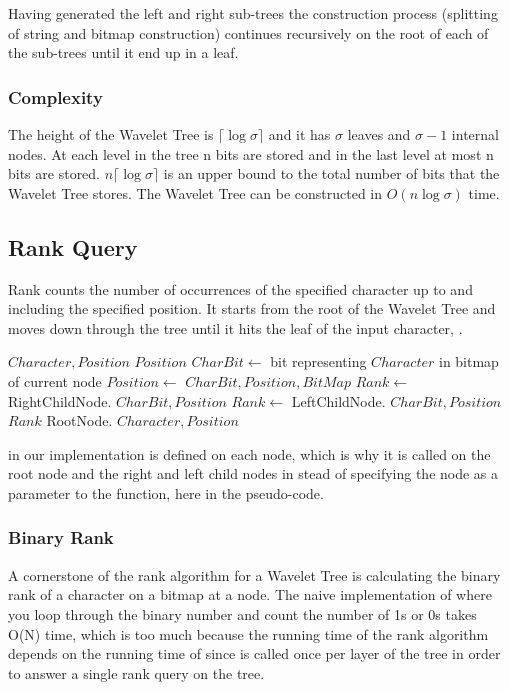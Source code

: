 Having generated the left and right sub-trees the construction process (splitting of string and bitmap construction) continues recursively on the root of each of the sub-trees until it end up in a leaf.

\subsubsection{Complexity}
The height of the Wavelet Tree is  $\lceil \log \sigma \rceil$ and it has $\sigma$ leaves and $\sigma - 1$ internal nodes. 
At each level in the tree n bits are stored and in the last level at most n bits are stored. $n \lceil \log \sigma \rceil$ is an upper bound to the total number of bits that the Wavelet Tree stores. 
The Wavelet Tree can be constructed in $O(n \log \sigma)$ time.

\subsection{Rank Query}
Rank counts the number of occurrences of the specified character up to and including the specified position. 
It starts from the root of the Wavelet Tree and moves down through the tree until it hits the leaf of the input character, \citep{Claude08practicalrankselect}.

\begin{mdframed}[nobreak]
\begin{algorithmic} 
 {$Character, Position$}
\State \Return $Position$
\EndIf
\State $CharBit \gets$ bit representing $Character$ in bitmap of current node
\State $Position \gets$  {$CharBit, Position, BitMap$}
	\State $Rank \gets$ RightChildNode. {$CharBit, Position$}
\Else
	\State $Rank \gets$ LeftChildNode. {$CharBit, Position$}
\EndIf
\State \Return $Rank$ 
\EndFunction
\State RootNode. {$Character, Position$}
\end{algorithmic}
\end{mdframed}


\noindent {} in our implementation is defined on each node, which is why it is called on the root node and the right and left child nodes in stead of specifying the node as a parameter to the  function, here in the pseudo-code.

\subsubsection{Binary Rank} 
\label{sec:TheoryBinaryRank}
A cornerstone of the rank algorithm for a Wavelet Tree is calculating the binary rank of a character on a bitmap at a node.
The naive implementation of  where you loop through the binary number and count the number of 1s or 0s takes O(N) time, which is too much because the running time of the rank algorithm depends on the running time of  since  is called once per layer of the tree in order to answer a single rank query on the tree.

